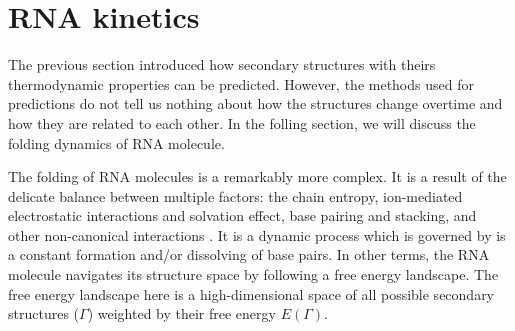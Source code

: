 \section{RNA kinetics} %
The previous section introduced how secondary structures with theirs thermodynamic properties can be predicted. However, the methods used for predictions do not tell us nothing about how the structures change overtime and how they are related to each other. In the folling section, we will discuss the folding dynamics of RNA molecule. 

The folding of RNA molecules is a remarkably more complex. It is a result of the delicate balance between multiple factors: the chain entropy, ion-mediated electrostatic interactions and solvation effect, base pairing and stacking, and other non-canonical interactions \cite{chen2008rna}. It is a dynamic process which is governed by is a constant formation and/or dissolving of base pairs. In other terms, the RNA molecule navigates its structure space by following a free energy landscape. The free energy landscape here is a high-dimensional space of all possible secondary structures ($\Gamma$) weighted by their free energy $E(\Gamma)$.  


